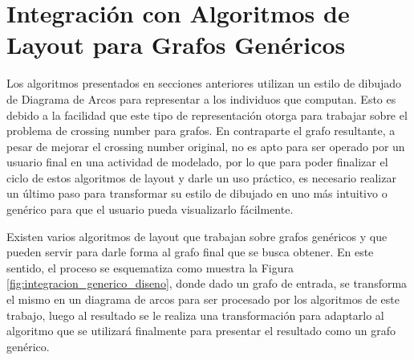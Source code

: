 	
	
	
	
	
	

\section{Integración con Algoritmos de Layout para Grafos Genéricos}
\label{sec:integracion_generico}
Los algoritmos presentados en secciones anteriores utilizan un estilo de dibujado de Diagrama de Arcos para representar a los individuos que computan. Esto es debido a la facilidad que este tipo de representación otorga para trabajar sobre el problema de crossing number para grafos. En contraparte el grafo resultante, a pesar de mejorar el crossing number original, no es apto para ser operado por un usuario final en una actividad de modelado, por lo que para poder finalizar el ciclo de estos algoritmos de layout y darle un uso práctico, es necesario realizar un último paso para transformar su estilo de dibujado en uno más intuitivo o genérico para que el usuario pueda visualizarlo fácilmente.

Existen varios algoritmos de layout que trabajan sobre grafos genéricos y que pueden servir para darle forma al grafo final que se busca obtener. En este sentido, el proceso se esquematiza como muestra la Figura \ref{fig:integracion_generico_diseno}, donde dado un grafo de entrada, se transforma el mismo en un diagrama de arcos para ser procesado por los algoritmos de este trabajo, luego al resultado se le realiza una transformación para adaptarlo al algoritmo que se utilizará finalmente para presentar el resultado como un grafo genérico.

